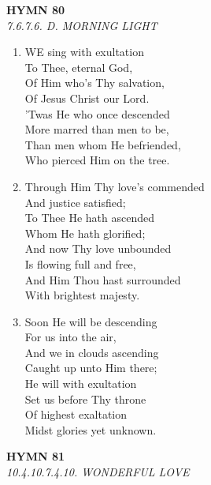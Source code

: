 \documentclass[11pt,a4paper]{article}
\begin{document}
\newpage
\begin{center}
    {\Large \textbf{HYMN 80}}
    \\
    \textit{7.6.7.6. D. MORNING LIGHT}
\end{center}
\vspace{1em}

\begin{enumerate}
    \item WE sing with exultation \\
        To Thee, eternal God, \\
        Of Him who's Thy salvation, \\
        Of Jesus Christ our Lord. \\
        'Twas He who once descended \\
        More marred than men to be, \\
        Than men whom He befriended, \\
        Who pierced Him on the tree.

    \item Through Him Thy love's commended \\
        And justice satisfied; \\
        To Thee He hath ascended \\
        Whom He hath glorified; \\
        And now Thy love unbounded \\
        Is flowing full and free, \\
        And Him Thou hast surrounded \\
        With brightest majesty.

    \item Soon He will be descending \\
        For us into the air, \\
        And we in clouds ascending \\
        Caught up unto Him there; \\
        He will with exultation \\
        Set us before Thy throne \\
        Of highest exaltation \\
        Midst glories yet unknown.

\end{enumerate}

\newpage
\begin{center}
    {\Large \textbf{HYMN 81\textdagger{}}}
    \\
    \textit{10.4.10.7.4.10. WONDERFUL LOVE}
\end{center}
\vspace{1em}
\end{document}
